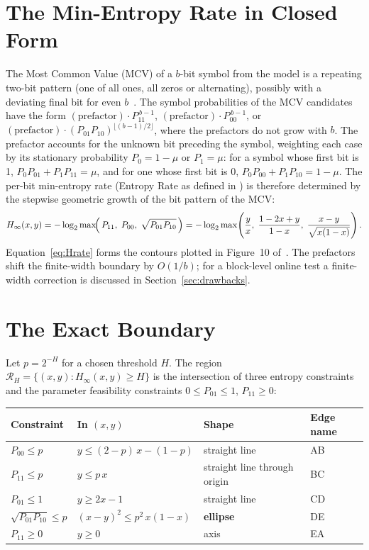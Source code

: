 \documentclass[11pt]{article}
\begin{document}
\section{The Min-Entropy Rate in Closed Form}
\label{sec:rate}

The Most Common Value (MCV) of a $b$-bit symbol from the model is a repeating
two-bit pattern (one of all ones, all zeros or alternating), possibly with a
deviating final bit for even $b$~\cite{johnston2024}. The symbol probabilities
of the MCV candidates have the form
$(\text{prefactor})\cdot P_{11}^{\,b-1}$,
$(\text{prefactor})\cdot P_{00}^{\,b-1}$, or
$(\text{prefactor})\cdot (P_{01}P_{10})^{\lfloor (b-1)/2\rfloor}$,
where the prefactors do not grow with $b$. The prefactor accounts for the
unknown bit preceding the symbol, weighting each case by its stationary
probability $P_0=1-\mu$ or $P_1=\mu$: for a symbol whose first bit is 1,
$P_0P_{01}+P_1P_{11}=\mu$, and for one whose first bit is 0,
$P_0P_{00}+P_1P_{10}=1-\mu$.
The per-bit min-entropy rate (Entropy Rate as defined in \cite{SP80090B})
is therefore determined by the stepwise geometric growth of the bit pattern
of the MCV:
\begin{equation}
H_\infty(x,y)
= -\log_2 \max\!\Bigl(\, P_{11},\; P_{00},\; \sqrt{P_{01}P_{10}} \,\Bigr)
= -\log_2 \max\!\left( \frac{y}{x},\;
\frac{1-2x+y}{1-x},\;
\frac{x-y}{\sqrt{x(1-x)}} \right).
\label{eq:Hrate}
\end{equation}
Equation~\eqref{eq:Hrate} forms the contours plotted
in Figure~10 of~\cite{johnston2024}. The prefactors shift the finite-width
boundary by $O(1/b)$; for a block-level online test a finite-width correction 
is discussed in Section~\ref{sec:drawbacks}.

\section{The Exact Boundary}
\label{sec:boundary}

Let $p=2^{-H}$ for a chosen threshold $H$. The region
$\mathcal{R}_H=\{(x,y): H_\infty(x,y)\ge H\}$ is the intersection of three
entropy constraints and the parameter feasibility constraints
$0\le P_{01}\le 1$, $P_{11}\ge 0$:
\begin{center}
\begin{tabular}{llll}
\toprule
Constraint & In $(x,y)$ & Shape & Edge name \\
\midrule
$P_{00}\le p$ & $y \le (2-p)\,x - (1-p)$ & straight line & AB \\
$P_{11}\le p$ & $y \le p\,x$ & straight line through origin & BC \\
$P_{01}\le 1$ & $y \ge 2x-1$ & straight line & CD \\
$\sqrt{P_{01}P_{10}}\le p$ & $(x-y)^2 \le p^2\,x(1-x)$ & \textbf{ellipse} & DE \\
$P_{11}\ge 0$ & $y\ge 0$ & axis & EA \\
\bottomrule
\end{tabular}
\end{center}
\end{document}
